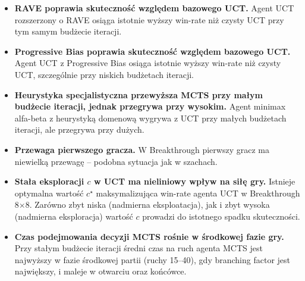 \begin{itemize}
    \item[\textbf{H1}] \textbf{RAVE poprawia skuteczność względem bazowego UCT.}
          Agent UCT rozszerzony o RAVE osiąga istotnie wyższy win-rate niż czysty
          UCT przy tym samym budżecie iteracji.

    \item[\textbf{H2}] \textbf{Progressive Bias poprawia skuteczność względem
          bazowego UCT.} Agent UCT z Progressive Bias osiąga istotnie wyższy
          win-rate niż czysty UCT, szczególnie przy niskich budżetach iteracji.

    \item[\textbf{H3}] \textbf{Heurystyka specjalistyczna przewyższa MCTS przy
          małym budżecie iteracji, jednak przegrywa przy wysokim.} Agent minimax
          alfa-beta z heurystyką domenową wygrywa z UCT przy małych budżetach
          iteracji, ale przegrywa przy dużych.

    \item[\textbf{H4}] \textbf{Przewaga pierwszego gracza.} W Breakthrough
          pierwszy gracz ma niewielką przewagę -- podobna sytuacja jak
          w szachach.

    \item[\textbf{H5}] \textbf{Stała eksploracji $c$ w UCT ma nieliniowy wpływ
          na siłę gry.} Istnieje optymalna wartość $c^\star$ maksymalizująca
          win-rate agenta UCT w Breakthrough 8$\times$8. Zarówno zbyt niska
          (nadmierna eksploatacja), jak i zbyt wysoka (nadmierna eksploracja)
          wartość $c$ prowadzi do istotnego spadku skuteczności.

    \item[\textbf{H6}] \textbf{Czas podejmowania decyzji MCTS rośnie w środkowej
          fazie gry.} Przy stałym budżecie iteracji średni czas na ruch agenta
          MCTS jest najwyższy w fazie środkowej partii (ruchy 15--40), gdy
          branching factor jest największy, i maleje w otwarciu oraz końcówce.
\end{itemize}

